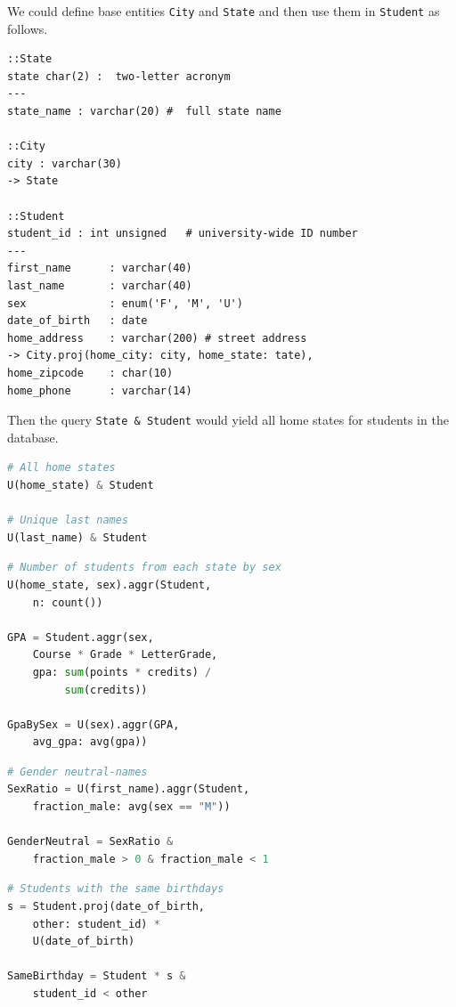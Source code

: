 \documentclass[letter,10pt]{article}
\begin{document}
We could define base entities \lstinline$City$ and \lstinline$State$ and then use them in \lstinline$Student$ as follows.
\begin{lstlisting}[language=dj, label={lst:city}]
::State
state char(2) :  two-letter acronym 
---
state_name : varchar(20) #  full state name

::City
city : varchar(30)
-> State

::Student     
student_id : int unsigned   # university-wide ID number 
---
first_name      : varchar(40)
last_name       : varchar(40)
sex             : enum('F', 'M', 'U')
date_of_birth   : date
home_address    : varchar(200) # street address
-> City.proj(home_city: city, home_state: tate),
home_zipcode    : char(10)
home_phone      : varchar(14) 
\end{lstlisting}

Then the query \lstinline$State & Student$ would yield all home states for students in the database.

\begin{lstlisting}[language=Python, morekeywords={avg, U}, caption={Creating a new entity.}, label={lst:u1}]
# All home states
U(home_state) & Student

# Unique last names
U(last_name) & Student 
\end{lstlisting}

\begin{lstlisting}[language=Python, morekeywords={avg, U}, caption={Aggregation by a new entity.}, label={lst:u2}]
# Number of students from each state by sex
U(home_state, sex).aggr(Student, 
    n: count())

GPA = Student.aggr(sex,
    Course * Grade * LetterGrade,
    gpa: sum(points * credits) /
         sum(credits))

GpaBySex = U(sex).aggr(GPA, 
    avg_gpa: avg(gpa))
\end{lstlisting}

\begin{lstlisting}[language=Python, morekeywords={avg, U}, caption={Aggregation and restriction.}, label={lst:u3}]
# Gender neutral-names
SexRatio = U(first_name).aggr(Student, 
    fraction_male: avg(sex == "M")) 

GenderNeutral = SexRatio & 
    fraction_male > 0 & fraction_male < 1
\end{lstlisting}

\begin{lstlisting}[language=Python, morekeywords={avg, U}, caption={Elevation of a secondary attribute.}, label={lst:u4} ]
# Students with the same birthdays
s = Student.proj(date_of_birth, 
    other: student_id) * 
    U(date_of_birth)

SameBirthday = Student * s & 
    student_id < other
\end{lstlisting}
\end{document}
